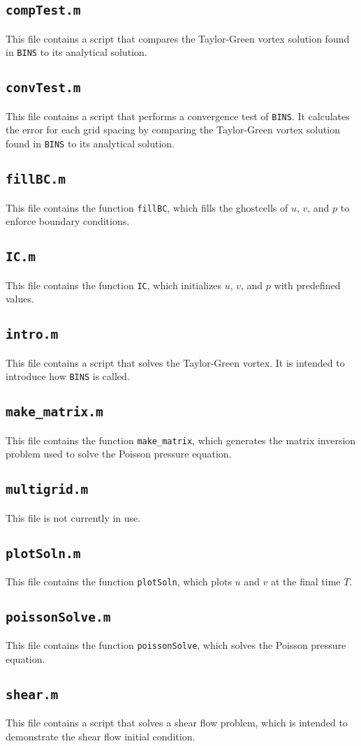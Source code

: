 \documentclass[12pt]{article}
\begin{document}
\subsection{\texttt{compTest.m}}
This file contains a script that compares the Taylor-Green vortex solution found in \texttt{BINS} to its analytical solution.

\subsection{\texttt{convTest.m}}
This file contains a script that performs a convergence test of \texttt{BINS}.  It calculates the error for each grid spacing by comparing the Taylor-Green vortex solution found in \texttt{BINS} to its analytical solution.

\subsection{\texttt{fillBC.m}}
This file contains the function \texttt{fillBC}, which fills the ghostcells of $u$, $v$, and $p$ to enforce boundary conditions.

\subsection{\texttt{IC.m}}
This file contains the function \texttt{IC}, which initializes $u$, $v$, and $p$ with predefined values.

\subsection{\texttt{intro.m}}
This file contains a script that solves the Taylor-Green vortex.  It is intended to introduce how \texttt{BINS} is called.

\subsection{\texttt{make\_matrix.m}}
This file contains the function \texttt{make\_matrix}, which generates the matrix inversion problem used to solve the Poisson pressure equation.

\subsection{\texttt{multigrid.m}}
This file is not currently in use.

\subsection{\texttt{plotSoln.m}}
This file contains the function \texttt{plotSoln}, which plots $u$ and $v$ at the final time $T$.

\subsection{\texttt{poissonSolve.m}}
This file contains the function \texttt{poissonSolve}, which solves the Poisson pressure equation.

\subsection{\texttt{shear.m}}
This file contains a script that solves a shear flow problem, which is intended to demonstrate the shear flow initial condition.
\end{document}
